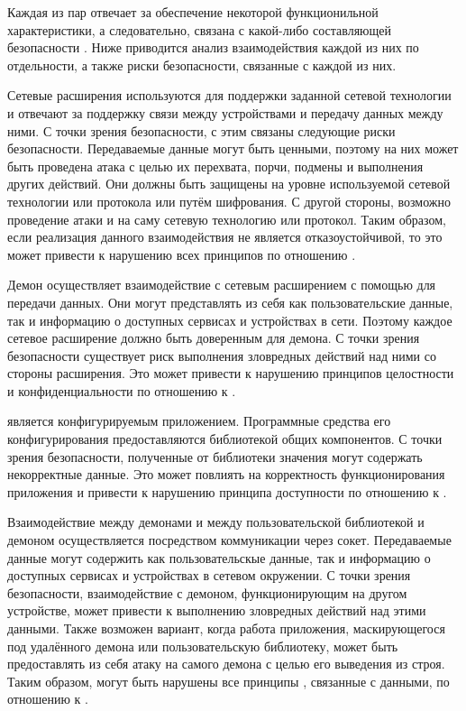 Каждая из пар отвечает за обеспечение некоторой функционильной характеристики, а следовательно, связана с какой-либо составляющей безопасности \PeerHood. 
%
Ниже приводится анализ взаимодействия каждой из них по отдельности, а также риски безопасности, связанные с каждой из них. 

%
Сетевые расширения используются для поддержки заданной сетевой технологии и отвечают за поддержку связи между устройствами и передачу данных между ними. 
%
С точки зрения безопасности, с этим связаны следующие риски безопасности. 
%
Передаваемые данные могут быть ценными, поэтому на них может быть проведена атака с целью их перехвата, порчи, подмены и выполнения других действий. 
%
Они должны быть защищены на уровне используемой сетевой технологии или протокола или путём шифрования. 
%
С другой стороны, возможно проведение атаки и на саму сетевую технологию или протокол. 
%
Таким образом, если реализация данного взаимодействия не является отказоустойчивой, то это может привести к нарушению всех принципов \CIATriad по отношению \PeerHood. 

%
Демон осуществляет взаимодействие с сетевым расширением с помощью  для передачи данных. 
%
Они могут представлять из себя как пользовательские данные, так и информацию о доступных сервисах и устройствах в сети. 
%
Поэтому каждое сетевое расширение должно быть доверенным для демона.
%
С точки зрения безопасности существует риск выполнения зловредных действий над ними со стороны расширения. 
%
Это может привести к нарушению принципов целостности и конфиденциальности по отношению к \PeerHood. 

%
\PeerHood является конфигурируемым приложением. 
%
Программные средства его конфигурирования предоставляются библиотекой общих компонентов. 
%
С точки зрения безопасности, полученные от библиотеки значения могут содержать некорректные данные. 
%
Это может повлиять на корректность функционирования приложения и привести к нарушению принципа доступности по отношению к \PeerHood. 

%
Взаимодействие между демонами и между пользовательской библиотекой и демоном осуществляется посредством коммуникации через сокет. 
%
Передаваемые данные могут содержить как пользовательскые данные, так и информацию о доступных сервисах и устройствах в сетевом окружении. 
%
С точки зрения безопасности, взаимодействие с демоном, функционирующим на другом устройстве, может привести к выполнению зловредных действий над этими данными. 
%
Также возможен вариант, когда работа приложения, маскирующегося под удалённого демона или пользовательскую библиотеку, может быть предоставлять из себя атаку на самого демона с целью его выведения из строя. 
%
Таким образом, могут быть нарушены все принципы \CIATriad, связанные с данными, по отношению к \PeerHood. 

